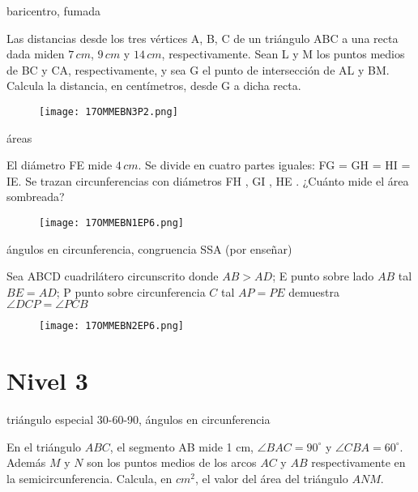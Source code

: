 baricentro, fumada

\begin{problem}[OMMEB 2017]
    Las distancias desde los tres vértices A, B, C de un 
    triángulo ABC a una recta dada miden \(7\, cm\), \(9\, cm\) 
    y \(14\, cm\), respectivamente. Sean L y M los puntos medios 
    de BC y CA, respectivamente, y sea G el punto de 
    intersección de AL y BM. Calcula la distancia, en 
    centímetros, desde G a dicha recta.
\end{problem}

\begin{figure}[h]
    \centering
    \texttt{[image: 17OMMEBN3P2.png]}
\end{figure}

áreas

\begin{problem}[OMMEB 2017]
    El diámetro FE mide \(4\,cm.\) Se divide en cuatro partes 
    iguales: FG = GH = HI = IE. Se trazan circunferencias con 
    diámetros FH , GI , HE . ¿Cuánto mide el área sombreada?
\end{problem}

\begin{figure}[h]
    \centering
    \texttt{[image: 17OMMEBN1EP6.png]}
\end{figure}

ángulos en circunferencia, congruencia SSA (por enseñar)

\begin{problem}[OMMEB 2017]
    Sea ABCD cuadrilátero circunscrito donde $AB>AD$; E punto 
    sobre lado $AB$ tal $BE=AD$; P punto sobre circunferencia 
    $C$ tal $AP=PE$ demuestra $\angle DCP=\angle PCB$
\end{problem}

\begin{figure}[h]
    \centering
    \texttt{[image: 17OMMEBN2EP6.png]}
\end{figure}

\section{Nivel 3}

triángulo especial 30-60-90, ángulos en circunferencia

\begin{problem}[OMMEB 2017]
    En el triángulo $ABC$, el segmento AB mide 1 cm, 
    $\angle BAC = 90^{\circ}$ y $\angle CBA = 60^{\circ}$. 
    Además $M$ y $N$ son los puntos medios de los arcos $AC$ y 
    $AB$ respectivamente en la semicircunferencia. Calcula, en 
    $cm^2$, el valor del área del triángulo $ANM$.
\end{problem}

